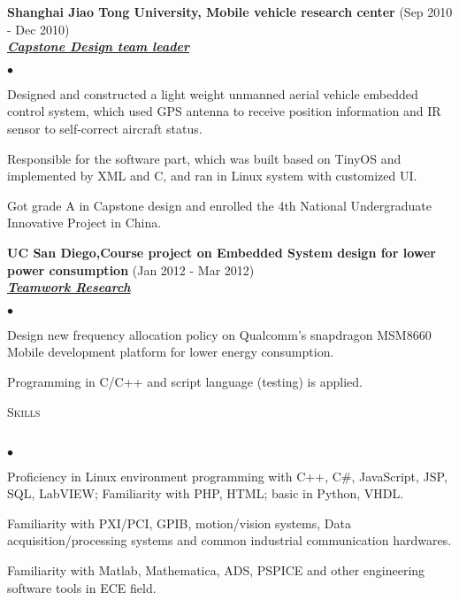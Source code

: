 \documentclass{article}
\newcommand{\lineunder}{\vspace*{-8pt} \\ \hspace*{-18pt} \hrulefill \\}
\newcommand{\header}[1]{{\hspace*{-15pt}\vspace*{6pt} \textsc{#1}} \vspace*{-6pt} \lineunder}
\newcommand{\employer}[3]{{ \textbf{#1} (#2)\\ \underline{\textbf{\emph{#3}}}\\  }}
\newenvironment{achievements}{\begin{list}{$\bullet$}{\topsep 0pt \itemsep -2pt}}{\vspace*{4pt}\end{list}}
\begin{document}
\employer{Shanghai Jiao Tong University, Mobile vehicle research center}{Sep 2010 - Dec 2010}{Capstone Design team leader}
	\begin{achievements}
	\item Designed and constructed a light weight unmanned aerial vehicle embedded control system, which used GPS
	      antenna to receive position information and IR sensor to self-correct aircraft status. 
	\item Responsible for the software part, which was built based on TinyOS and implemented by XML and C, and ran in Linux system with customized UI. 
	\item Got grade A in Capstone design and enrolled the 4th National Undergraduate Innovative Project in China. 
	\end{achievements}

\employer{UC San Diego,Course project on Embedded System design for lower power consumption}{Jan 2012 - Mar 2012}{Teamwork Research}
	\begin{achievements}
	\item Design new frequency allocation policy on Qualcomm’s snapdragon MSM8660 Mobile development platform for lower energy consumption. 
	\item Programming in C/C++ and script language (testing) is applied. 
	

	\end{achievements}

\header{Skills}
\begin{achievements}
\item Proficiency in Linux environment programming with C++, C\#, JavaScript, JSP, SQL, LabVIEW; Familiarity with PHP, HTML; basic in Python, VHDL.
\item Familiarity with PXI/PCI, GPIB, motion/vision systems, Data acquisition/processing systems and common industrial communication hardwares.
\item Familiarity with Matlab, Mathematica, ADS, PSPICE and other engineering software tools in ECE field.

\end{achievements}
\end{document}
